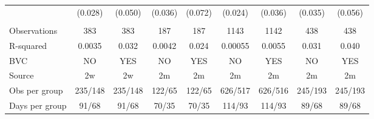 \begin{tabular}{lcccccccc}
      & (0.028) & (0.050) & (0.036) & (0.072) & (0.024) & (0.036) & (0.035) & (0.056) \\
      &       &       &       &       &       &       &       &  \\
Observations & 383   & 383   & 187   & 187   & 1143  & 1142  & 438   & 438 \\
R-squared & 0.0035 & 0.032 & 0.0042 & 0.024 & 0.00055 & 0.0055 & 0.031 & 0.040 \\
BVC   & NO    & YES   & NO    & YES   & NO    & YES   & NO    & YES \\
Source & 2w    & 2w    & 2m    & 2m    & 2m    & 2m    & 2m    & 2m \\
Obs per group & 235/148 & 235/148 & 122/65 & 122/65 & 626/517 & 626/516 & 245/193 & 245/193 \\
Days per group & 91/68 & 91/68 & 70/35 & 70/35 & 114/93 & 114/93 & 89/68 & 89/68 \\
\bottomrule
\bottomrule
\end{tabular}%
